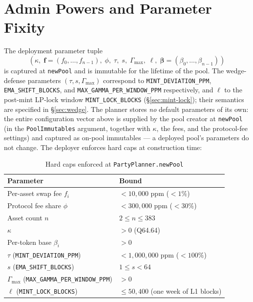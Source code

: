 \documentclass[11pt]{article}
\begin{document}
\section{Admin Powers and Parameter Fixity}
\label{sec:admin}

The deployment parameter tuple
\[
  (\kappa,\; \mathbf{f} = (f_0, \dots, f_{n-1}),\; \phi,\;
   \tau,\; s,\; \Gamma_{\max},\; \ell,\;
   \boldsymbol{\beta} = (\beta_0, \dots, \beta_{n-1}))
\]
is captured at \texttt{newPool} and is immutable for the lifetime of
the pool. The wedge-defense parameters
$(\tau, s, \Gamma_{\max})$ correspond to
\texttt{MINT\_DEVIATION\_PPM}, \texttt{EMA\_SHIFT\_BLOCKS}, and
\texttt{MAX\_GAMMA\_PER\_WINDOW\_PPM} respectively, and $\ell$ to the
post-mint LP-lock window \texttt{MINT\_LOCK\_BLOCKS}
(\S\ref{sec:mint-lock}); their semantics are
specified in \S\ref{sec:wedge}. The planner stores \emph{no} default
parameters of its own: the entire configuration vector above is
supplied by the pool creator at \texttt{newPool} (in the
\texttt{PoolImmutables} argument, together with $\kappa$, the fees, and
the protocol-fee settings) and captured as on-pool immutables --- a
deployed pool's parameters do not change. The
deployer enforces hard caps at construction time:

\begin{table}[h]
\centering
\caption{Hard caps enforced at \texttt{PartyPlanner.newPool}}
\label{tab:caps}
\begin{tabular}{ll}
\toprule
Parameter & Bound \\
\midrule
Per-asset swap fee $f_i$       & $< 10{,}000$ ppm ($< 1\%$) \\
Protocol fee share $\phi$      & $< 300{,}000$ ppm ($< 30\%$) \\
Asset count $n$                & $2 \le n \le 383$ \\
$\kappa$                       & $> 0$ (Q64.64) \\
Per-token base $\beta_i$       & $> 0$ \\
$\tau$ (\texttt{MINT\_DEVIATION\_PPM}) & $< 1{,}000{,}000$ ppm ($< 100\%$) \\
$s$  (\texttt{EMA\_SHIFT\_BLOCKS})     & $1 \le s < 64$ \\
$\Gamma_{\max}$ (\texttt{MAX\_GAMMA\_PER\_WINDOW\_PPM}) & $> 0$ \\
$\ell$ (\texttt{MINT\_LOCK\_BLOCKS}) & $\le 50{,}400$ (one week of L1 blocks) \\
\bottomrule
\end{tabular}
\end{table}
\end{document}
